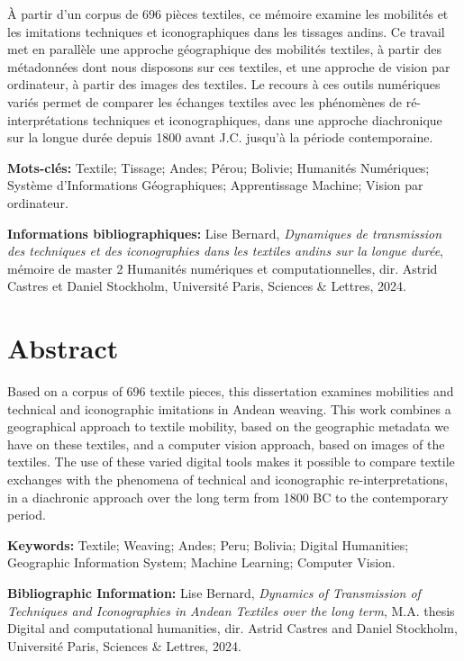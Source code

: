 \documentclass[a4paper, twoside]{book}
\begin{document}
À partir d'un corpus de 696 pièces textiles, ce mémoire examine les mobilités et les imitations techniques et iconographiques dans les tissages andins. Ce travail met en parallèle une approche géographique des mobilités textiles, à partir des métadonnées dont nous disposons sur ces textiles, et une approche de vision par ordinateur, à partir des images des textiles. Le recours à ces outils numériques variés permet de comparer les échanges textiles avec les phénomènes de ré-interprétations techniques et iconographiques, dans une approche diachronique sur la longue durée depuis 1800 avant J.C. jusqu’à la période contemporaine.

\medskip

\textbf{Mots-clés:} Textile; Tissage; Andes; Pérou; Bolivie; Humanités Numériques; Système d'Informations Géographiques; Apprentissage Machine; Vision par ordinateur.

\textbf{Informations bibliographiques:} Lise Bernard, \textit{Dynamiques de transmission des techniques et des iconographies dans les textiles andins sur la longue durée}, mémoire de master 2 \og Humanités numériques et computationnelles\fg{}, dir. Astrid Castres et Daniel Stockholm, Université Paris, Sciences \& Lettres, 2024.

\vspace{5pt}

\section*{Abstract}

Based on a corpus of 696 textile pieces, this dissertation examines mobilities and technical and iconographic imitations in Andean weaving. This work combines a geographical approach to textile mobility, based on the geographic metadata we have on these textiles, and a computer vision approach, based on images of the textiles. The use of these varied digital tools makes it possible to compare textile exchanges with the phenomena of technical and iconographic re-interpretations, in a diachronic approach over the long term from 1800 BC to the contemporary period.

\medskip

\textbf{Keywords:} Textile; Weaving; Andes; Peru; Bolivia; Digital Humanities; Geographic Information System; Machine Learning; Computer Vision.

\textbf{Bibliographic Information:} Lise Bernard, \textit{Dynamics of Transmission of Techniques and Iconographies in Andean Textiles over the long term}, M.A. thesis \og Digital and computational humanities\fg{}, dir. Astrid Castres and Daniel Stockholm, Université Paris, Sciences \& Lettres, 2024.
\end{document}
